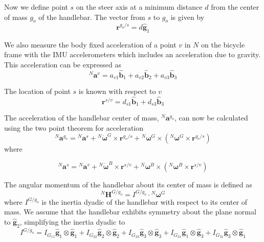 \documentclass[10pt]{article}
\begin{document}
Now we define point $s$ on the steer axis at a minimum distance $d$ from the
center of mass $g_o$ of the handlebar. The vector from $s$ to $g_o$ is given by 
%
\begin{equation}
  \mathbf{r}^{g_o/s} = d\hat{\mathbf{g}}_1
\end{equation}

We also measure the body fixed acceleration of a point $v$ in $N$ on the
bicycle frame with the IMU accelerometers which includes an acceleration due
to gravity. This acceleration can be expressed as
%
\begin{equation}
  ^N\mathbf{a}^v =
    a_{v1}\hat{\mathbf{b}}_1 +
    a_{v2}\hat{\mathbf{b}}_2 +
    a_{v3}\hat{\mathbf{b}}_3
  \label{eq:acceleration-of-v}
\end{equation}

The location of point $s$ is known with respect to $v$ 
%
\begin{equation}
  \mathbf{r}^{s/v} = d_{s1}\hat{\mathbf{b}}_1 + d_{s3}\hat{\mathbf{b}}_3
\end{equation}

The acceleration of the handlebar center of mass, $^N\mathbf{a}^{g_o}$, can
now be calculated using the two point theorem for acceleration \cite{Kane1985}
%
\begin{equation}
  ^N\mathbf{a}^{g_o} = {}^N\mathbf{a}^s +
    {}^N\dot{\boldsymbol{\omega}}^G\times\mathbf{r}^{g_o/s} +
    {}^N\boldsymbol{\omega}^G\times({}^N\boldsymbol{\omega}^G\times\mathbf{r}^{g_o/s})
\end{equation}
where

\begin{equation}
  ^N\mathbf{a}^s = {}^N\mathbf{a}^v +
    {}^N\dot{\boldsymbol{\omega}}^B\times\mathbf{r}^{s/v} +
    {}^N\boldsymbol{\omega}^B\times({}^N\boldsymbol{\omega}^B\times\mathbf{r}^{s/v})
\end{equation}

The angular momentum of the handlebar about its center of mass is defined as
%
\begin{equation}
  ^N\mathbf{H}^{G/g_o} = I^{G/g_o} \cdot {}^N\boldsymbol{\omega}^G
\end{equation}
%
where $I^{G/g_o}$ is the inertia dyadic of the handlebar with respect to its
center of mass. We assume that the handlebar exhibits symmetry about the plane
normal to $\hat{\mathbf{g}}_2$, simplifying the inertia dyadic to
%
\begin{equation}
  I^{G/g_o} =
    I_{G_{11}} \hat{\mathbf{g}}_1 \otimes \hat{\mathbf{g}}_1 +
    I_{G_{22}} \hat{\mathbf{g}}_2 \otimes \hat{\mathbf{g}}_2 +
    I_{G_{33}} \hat{\mathbf{g}}_3 \otimes \hat{\mathbf{g}}_3 +
    I_{G_{31}} \hat{\mathbf{g}}_1 \otimes \hat{\mathbf{g}}_3 +
    I_{G_{31}} \hat{\mathbf{g}}_3 \otimes \hat{\mathbf{g}}_1
\end{equation}
\end{document}

